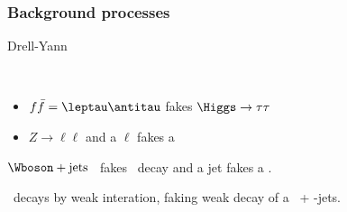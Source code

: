 \begin{frame}
\frametitle{Background processes}
\begin{block}{Drell-Yann}
\hfill
\begin{minipage}[c]{.45\textwidth}
\vspace{\baselineskip}



~
\end{minipage}
\hfill
\begin{minipage}[c]{.4\linewidth}
\begin{itemize}
\item $f\bar{f} = \leptau\antitau$ fakes $\Higgs\to\tau\tau$
\item $Z\to\ell\ell$ and a $\ell$ fakes a \tauh
\end{itemize}
\end{minipage}
\end{block}

\begin{block}{$\Wboson+\text{jets}$}
\Wboson\ fakes \tau\ decay and a jet fakes a \tauh.
\end{block}

\begin{block}{\quarkt\antiquarkt}
\quarkt\ decays by weak interation, faking weak decay of a \tau\ + \quarkb-jets.
\end{block}

\end{frame}
